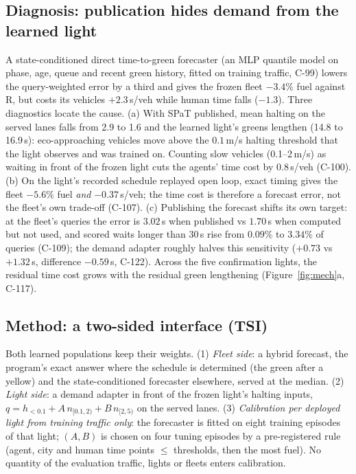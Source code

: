 \documentclass[11pt]{article}
\begin{document}
\subsection{Diagnosis: publication hides demand from the learned light}
A state-conditioned direct time-to-green forecaster (an MLP quantile model on phase, age, queue and recent green history, fitted on training
traffic, C-99) lowers the query-weighted error by a third and gives the frozen fleet $-3.4\%$ fuel against R, but costs its vehicles
$+2.3$\,s/veh while human time falls ($-1.3$). Three diagnostics locate the cause.
(a) With SPaT published, mean halting on the served lanes falls from 2.9 to 1.6 and the learned light's greens lengthen (14.8 to 16.9\,s):
eco-approaching vehicles move above the $0.1$\,m/s halting threshold that the light observes and was trained on. Counting slow vehicles
(0.1--2\,m/s) as waiting in front of the frozen light cuts the agents' time cost by $0.8$\,s/veh (C-100).
(b) On the light's recorded schedule replayed open loop, exact timing gives the fleet $-5.6\%$ fuel \emph{and} $-0.37$\,s/veh; the time
cost is therefore a forecast error, not the fleet's own trade-off (C-107).
(c) Publishing the forecast shifts its own target: at the fleet's queries the error is $3.02$\,s when published vs $1.70$\,s when computed
but not used, and scored waits longer than 30\,s rise from $0.09\%$ to $3.34\%$ of queries (C-109); the demand adapter roughly halves this
sensitivity ($+0.73$ vs $+1.32$\,s, difference $-0.59$\,s, C-122). Across the five confirmation lights, the residual time cost grows with the residual green lengthening
(Figure~\ref{fig:mech}a, C-117).

\subsection{Method: a two-sided interface (TSI)}
Both learned populations keep their weights. (1) \emph{Fleet side}: a hybrid forecast, the program's exact answer where the schedule is
determined (the green after a yellow) and the state-conditioned forecaster elsewhere, served at the median. (2) \emph{Light side}: a demand
adapter in front of the frozen light's halting inputs, $q = h_{<0.1} + A\,n_{[0.1,2)} + B\,n_{[2,5)}$ on the served lanes. (3)
\emph{Calibration per deployed light from training traffic only}: the forecaster is fitted on eight training episodes of that light; $(A,B)$
is chosen on four tuning episodes by a pre-registered rule (agent, city and human time points $\le$ thresholds, then the most fuel). No
quantity of the evaluation traffic, lights or fleets enters calibration.
\end{document}
